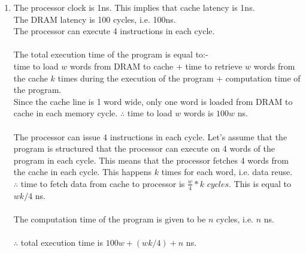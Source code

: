 \documentclass{article}
\begin{document}
\begin{enumerate}[label=\Large\textbf{\arabic*}.]
	
\item
	The processor clock is 1ns. This implies that cache latency is 1ns.\\
	The DRAM latency is 100 cycles, i.e. 100ns. \\
	The processor can execute 4 instructions in each cycle. \\
	\\
	The total execution time of the program is equal to:- \\
	time to load $w$ words from DRAM to cache $+$ time to retrieve $w$ words from the cache $k$ times during the execution of the program $+$ computation time of the program.
	\\
	Since the cache line is 1 word wide, only one word is loaded from DRAM to cache in each memory cycle. $\therefore$ time to load $w$ words is $100w$ ns. \\
	\\
	The processor can issue 4 instructions in each cycle. Let's assume that the program is structured that the processor can execute on 4 words of the program in each cycle.
	This means that the processor fetches 4 words from the cache in each cycle. This happens $k$ times for each word, i.e. data reuse.\\
	$\therefore$ time to fetch data from cache to processor is $\frac{w}{4} * k$ $cycles$.
	This is equal to $wk/4$ ns. \\
	\\
	The computation time of the program is given to be $n$ cycles, i.e. $n$ ns.\\
	\\
	$\therefore$ total execution time is $100w + (wk/4) + n$ ns.
	
	


\end{enumerate}
\end{document}
